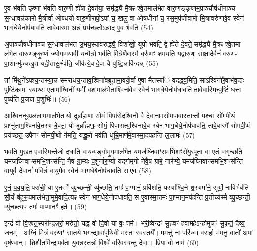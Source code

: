 ए॒व भ॑वति कृ॒ष्णा भ॑वति वारु॒णी ह्ये॑षा दे॒वत॑या॒ समृ॑द्ध्यै मै॒त्रꣴ श्वे॒तमाल॑भेत वारु॒णङ्कृ॒ष्णम॒पा़ञ्चौष॑धीनाञ्च स॒न्धावन्न॑कामो मै॒त्रीर्वा ओष॑धयो वारु॒णीरापो॒\-ऽपां च॒ खलु॒ वा ओष॑धीनां च॒ रस॒मुप॑जीवामो मि॒त्रावरु॑णावे॒व स्वेन॑ भाग॒धेये॒नोप॑धावति॒ तावे॒वास्मा॒ अन्नं॒ प्रय॑च्छतो\-ऽन्ना॒द ए॒व भ॑वति (54)

अ॒पाञ्चौष॑धीनाञ्च स॒न्धावाल॑भत उ॒भय॒स्याव॑रुद्ध्यै॒ विशा॑खो॒ यूपो॑ भवति॒ द्वे ह्ये॑ते दे॒वते॒ समृ॑द्ध्यै मै॒त्रꣴ श्वे॒तमा ल॑भेत वारु॒णङ्कृ॒ष्णं ज्योगा॑मयावी॒ यन्मै॒त्रो भव॑ति मि॒त्रेणै॒वास्मै॒ वरु॑णꣳ शमयति॒ यद्वा॑रु॒णः सा॒क्षादे॒वैनं॑ वरुण- पा॒शान्मु॑ञ्चत्यु॒त यदी॒तासु॒र्भव॑ति॒ जीव॑त्ये॒व दे॒वा वै पुष्टि॒न्नावि॑न्दन्न् (55)

तां मि॑थु॒ने॑\-ऽपश्य॒न्तस्या॒न्न सम॑राधय॒न्ताव॒श्विना॑वब्रूतामा॒वयो॒र्वा ए॒षा मैतस्या᳚ं वदद्ध्व॒मिति॒ सा\-ऽश्विनो॑रे॒वाभ॑व॒द्यः पुष्टि॑कामः॒ स्याथ्स ए॒तामा᳚श्वि॒नीं य॒मीं व॒शामाल॑भेता॒श्विना॑वे॒व स्वेन॑ भाग॒धेये॒नोप॑धावति॒ तावे॒वास्मि॒न्पुष्टिं॑ धत्तः॒ पुष्य॑ति प्र॒जया॑ प॒शुभिः॑॥ (56)

{\anuvakamend[{अ॒न्ना॒दो᳚\-ऽन्ना॒द ए॒व भ॑वत्यविन्द॒न्पञ्च॑चत्वारिꣳशच्च।9।}]}

आ॒श्वि॒नन्धू॒म्रल॑लाम॒माल॑भेत॒ यो दुर्ब्रा᳚ह्मणः॒ सोमं॒ पिपा॑सेद॒श्विनौ॒ वै दे॒वाना॒मसो॑मपावास्ता॒न्तौ प॒श्चा सो॑मपी॒थं प्राप्नु॑ताम॒श्विना॑वे॒तस्य॑ दे॒वता॒ यो दुर्ब्रा᳚ह्मणः॒ सोमं॒ पिपा॑सत्य॒श्विना॑वे॒व स्वेन॑ भाग॒धेये॒नोप॑धावति॒ तावे॒वास्मै॑ सोमपी॒थं प्रय॑च्छत॒ उपै॑नꣳ सोमपी॒थो न॑मति॒ यद्धू॒म्रो भव॑ति धूम्रि॒माण॑मे॒वास्मा॒दप॑हन्ति ल॒लामः॑ (57)

भ॒व॒ति॒ मु॒ख॒त ए॒वास्मि॒न्तेजो॑ दधाति वाय॒व्य॑ङ्गोमृ॒गमाल॑भेत॒ यमज॑घ्निवाꣳसमभि॒शꣳसे॑यु॒रपू॑ता॒ वा ए॒तं वागृ॑च्छति॒ यमज॑घ्निवाꣳसमभि॒शꣳस॑न्ति॒ नैष ग्रा॒म्यः प॒शुर्नार॒ण्यो यद्गो॑मृ॒गो नेवै॒ष ग्रामे॒ नार॑ण्ये॒ यमज॑घ्निवाꣳसमभि॒शꣳस॑न्ति वा॒युर्वै दे॒वानां᳚ प॒वित्रं॑ वा॒युमे॒व स्वेन॑ भाग॒धेये॒नोप॑धावति॒ स ए॒व (58)

ए॒नं॒ प॒व॒य॒ति॒ परा॑ची॒ वा ए॒तस्मै᳚ व्यु॒च्छन्ती॒ व्यु॑च्छति॒ तमः॑ पा॒प्मानं॒ प्रवि॑शति॒ यस्या᳚श्वि॒ने श॒स्यमा॑ने॒ सूर्यो॒ नाविर्भव॑ति सौ॒र्यं ब॑हुरू॒पमाल॑भेता॒मुमे॒वादि॒त्यꣴ स्वेन॑ भाग॒धेये॒नोप॑धावति॒ स ए॒वास्मा॒त्तमः॑ पा॒प्मान॒मप॑हन्ति प्र॒तीच्य॑स्मै व्यु॒च्छन्ती॒ व्यु॑च्छ॒त्यप॒ तमः॑ पा॒प्मानꣳ॑ हते॥ (59)

{\anuvakamend[{ल॒लामः॒ स ए॒व षट्च॑त्वारिꣳशच्च॥10॥}]}

इन्द्रं॑ वो वि॒श्वत॒स्परीन्द्र॒न्नरो॒ मरु॑तो॒ यद्ध॑ वो दि॒वो या वः॒ शर्म॑। भरे॒ष्विन्द्रꣳ॑ सु॒हवꣳ॑ हवामहे\-ऽꣳहो॒मुचꣳ॑ सु॒कृतं॒ दैव्यं॒ जनम्᳚। अ॒ग्निं मि॒त्रं वरु॑णꣳ सा॒तये॒ भग॒न्द्यावा॑पृथि॒वी म॒रुतः॑ स्व॒स्तये᳚। म॒मत्तु॑ नः॒ परि॑ज्मा वस॒र्\mbox{}हा म॒मत्तु॒ वातो॑ अ॒पां वृष॑ण्वान्। शि॒शी॒तमि॑न्द्रापर्वता यु॒वन्न॒स्तन्नो॒ विश्वे॑ वरिवस्यन्तु दे॒वाः। प्रि॒या वो॒ नाम॑ (60)

